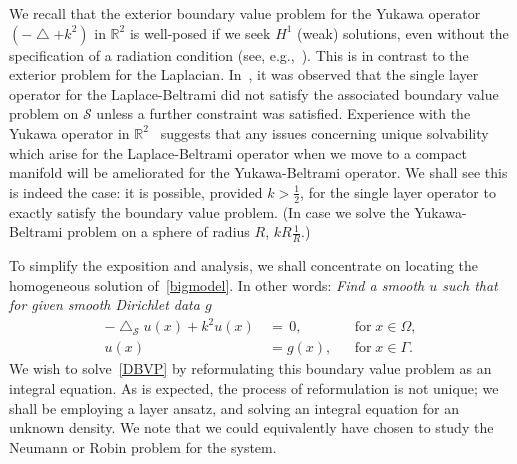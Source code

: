 \documentclass[final]{siamltex}
\newcommand{\lap}{\bigtriangleup}
\renewcommand{\S} {\mathcal{S}}
\begin{document}
We recall that the exterior boundary value problem for the Yukawa
operator $(-\lap + k^2)$  in $\mathbb{R}^2$ is well-posed if we seek
$H^1$ (weak) solutions, even without the specification of a radiation
condition (see, e.g.,~\cite{gatica}). This is in contrast to the
exterior problem for the Laplacian.  In~\cite{gemmrich}, it was observed
that the single layer operator for the Laplace-Beltrami did not satisfy
the associated boundary value problem on $\S$ unless a further
constraint was satisfied. Experience with the Yukawa operator in
$\mathbb{R}^2$~\cite{kro:qua2011,qua2011} suggests that any issues
concerning unique solvability which arise for the Laplace-Beltrami
operator when we move to a compact manifold will be ameliorated for the
Yukawa-Beltrami operator.  We shall see this is indeed the case: it is
possible, provided $k>\frac{1}{2}$, for the single layer operator to
exactly satisfy the boundary value problem. (In case we solve the Yukawa-Beltrami problem on a sphere of radius $R$, $kR\frac{1}{R}$.)

To simplify the exposition and analysis, we shall concentrate on
locating the homogeneous solution of~\eqref{bigmodel}.  In other words:
{\it Find a smooth $u$ such that for given smooth Dirichlet data $g$}
\begin{subequations}
  \label{DBVP}
  \begin{align}
    -\lap_{\S} u(x) +k^2u(x)\, &= \, 0, &&\mbox{for} \; 
      x \in { \Omega},\\
    u(x) &= g(x), &&\mbox{for} \; x \in \Gamma.
  \end{align}
\end{subequations}
We wish to solve~\eqref{DBVP} by reformulating this boundary value
problem as an integral equation. As is expected, the process of
reformulation is not unique; we shall be employing a layer ansatz, and
solving an integral equation for an unknown density.  We note that we
could equivalently have chosen to study the Neumann or Robin problem
for the system.


\end{document}
